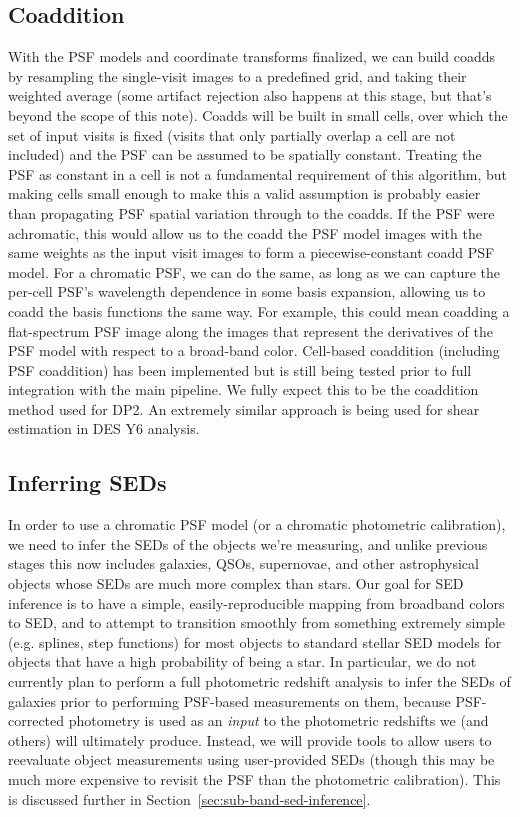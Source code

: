 \documentclass[DM,authoryear,toc]{lsstdoc}
\begin{document}
\subsection{Coaddition}

With the PSF models and coordinate transforms finalized, we can build coadds by resampling the single-visit images to a predefined grid, and taking their weighted average (some artifact rejection also happens at this stage, but that's beyond the scope of this note).
Coadds will be built in small cells, over which the set of input visits is fixed (visits that only partially overlap a cell are not included) and the PSF can be assumed to be spatially constant.
Treating the PSF as constant in a cell is not a fundamental requirement of this algorithm, but making cells small enough to make this a valid assumption is probably easier than propagating PSF spatial variation through to the coadds.
If the PSF were achromatic, this would allow us to the coadd the PSF model images with the same weights as the input visit images to form a piecewise-constant coadd PSF model.
For a chromatic PSF, we can do the same, as long as we can capture the per-cell PSF's wavelength dependence in some basis expansion, allowing us to coadd the basis functions the same way.
For example, this could mean coadding a flat-spectrum PSF image along the images that represent the derivatives of the PSF model with respect to a broad-band color.
Cell-based coaddition (including PSF coaddition) has been implemented but is still being tested prior to full integration with the main pipeline.
We fully expect this to be the coaddition method used for DP2.
An extremely similar approach is being used for shear estimation in DES Y6 analysis.

\subsection{Inferring SEDs}

In order to use a chromatic PSF model (or a chromatic photometric calibration), we need to infer the SEDs of the objects we're measuring, and unlike previous stages this now includes galaxies, QSOs, supernovae, and other astrophysical objects whose SEDs are much more complex than stars.
Our goal for SED inference is to have a simple, easily-reproducible mapping from broadband colors to SED, and to attempt to transition smoothly from something extremely simple (e.g. splines, step functions) for most objects to standard stellar SED models for objects that have a high probability of being a star.
In particular, we do not currently plan to perform a full photometric redshift analysis to infer the SEDs of galaxies prior to performing PSF-based measurements on them, because PSF-corrected photometry is used as an \emph{input} to the photometric redshifts we (and others) will ultimately produce.
Instead, we will provide tools to allow users to reevaluate object measurements using user-provided SEDs (though this may be much more expensive to revisit the PSF than the photometric calibration).
This is discussed further in Section~\ref{sec:sub-band-sed-inference}.
\end{document}

